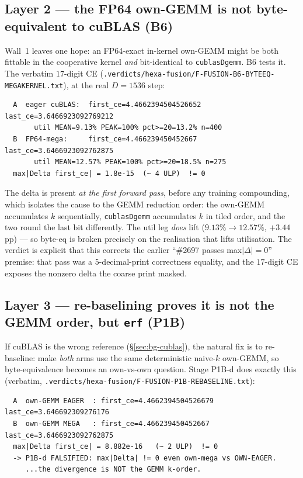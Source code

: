 \documentclass[11pt,a4paper]{article}
\newcommand{\verdict}[1]{\texttt{.verdicts/hexa-fusion/#1}}
\begin{document}
\subsection{Layer 2 --- the FP64 own-GEMM is not byte-equivalent to cuBLAS (B6)}
\label{sec:b6}

Wall~1 leaves one hope: an FP64-exact in-kernel own-GEMM might be both
fittable in the cooperative kernel \emph{and} bit-identical to
\texttt{cublasDgemm}. B6 tests it. The verbatim $17$-digit CE
(\verdict{F-FUSION-B6-BYTEEQ-MEGAKERNEL.txt}), at the real $D{=}1536$ step:

\begin{lstlisting}
  A  eager cuBLAS:  first_ce=4.4662394504526652  last_ce=3.6466923092769212
       util MEAN=9.13% PEAK=100% pct>=20=13.2% n=400
  B  FP64-mega:     first_ce=4.466239450452667   last_ce=3.6466923092762875
       util MEAN=12.57% PEAK=100% pct>=20=18.5% n=275
  max|Delta first_ce| = 1.8e-15  (~ 4 ULP)  != 0
\end{lstlisting}

\noindent The delta is present \emph{at the first forward pass}, before any
training compounding, which isolates the cause to the GEMM reduction order:
the own-GEMM accumulates $k$ sequentially, \texttt{cublasDgemm} accumulates
$k$ in tiled order, and the two round the last bit differently. The util
leg \emph{does} lift ($9.13\%\to12.57\%$, $+3.44$\,pp) --- so byte-eq is
broken precisely on the realisation that lifts utilisation. The verdict is
explicit that this corrects the earlier ``\#2697 passes max$|\Delta|=0$''
premise: that pass was a $5$-decimal-print correctness equality, and the
$17$-digit CE exposes the nonzero delta the coarse print masked.

\subsection{Layer 3 --- re-baselining proves it is not the GEMM order, but \texttt{erf} (P1B)}
\label{sec:p1b}

If cuBLAS is the wrong reference (\S\ref{sec:bg-cublas}), the natural fix is
to re-baseline: make \emph{both} arms use the same deterministic naive-$k$
own-GEMM, so byte-equivalence becomes an own-vs-own question. Stage P1B-d
does exactly this (verbatim, \verdict{F-FUSION-P1B-REBASELINE.txt}):

\begin{lstlisting}
  A  own-GEMM EAGER  : first_ce=4.4662394504526679 last_ce=3.646692309276176
  B  own-GEMM MEGA   : first_ce=4.466239450452667  last_ce=3.6466923092762875
  max|Delta first_ce| = 8.882e-16   (~ 2 ULP)  != 0
  -> P1B-d FALSIFIED: max|Delta| != 0 even own-mega vs OWN-EAGER.
     ...the divergence is NOT the GEMM k-order.
\end{lstlisting}
\end{document}
